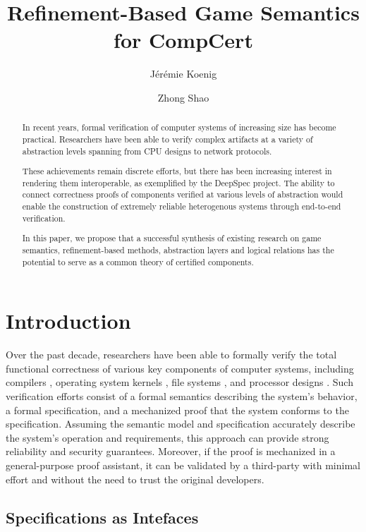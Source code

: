 \documentclass[acmsmall,timestamp,review,anonymous]{acmart}
\title{Refinement-Based Game Semantics for CompCert}
\author{J\'er\'emie Koenig}
\affiliation{Yale University}
\author{Zhong Shao}
\affiliation{Yale University}
\begin{document}
\begin{abstract} %
In recent years,
formal verification of computer systems
of increasing size has become practical.
Researchers have been able to verify complex artifacts
at a variety of abstraction levels spanning
from CPU designs to network protocols.

These achievements remain discrete efforts, but
there has been increasing interest in rendering them interoperable,
as exemplified by the DeepSpec project.
The ability to connect correctness proofs of components
verified at various levels of abstraction
would enable the construction of extremely reliable heterogenous systems
through end-to-end verification.

In this paper,
we propose that a successful synthesis of existing research on
game semantics,
refinement-based methods,
abstraction layers and
logical relations
has the potential to serve as a common theory
of certified components.
\end{abstract}

\maketitle

\section{Introduction} %


Over the past decade,
researchers have been able to formally verify the
total functional correctness
of various key components of computer systems,
including
compilers \cite{compcert, vellvm},
operating system kernels \cite{sel4, popl15},
file systems \cite{fscq}, and
processor designs \cite{safe}.
Such verification efforts
consist of
a formal semantics describing the system's behavior,
a formal specification,
and a mechanized proof that
the system conforms to the specification.
Assuming the semantic model and specification accurately describe
the system's operation and requirements,
this approach can provide
strong reliability and security guarantees.
Moreover,
if the proof is mechanized in a general-purpose proof assistant,
it can be validated by a third-party with minimal effort
and without the need to trust the original developers.


\subsection{Specifications as Intefaces} %
\end{document}

